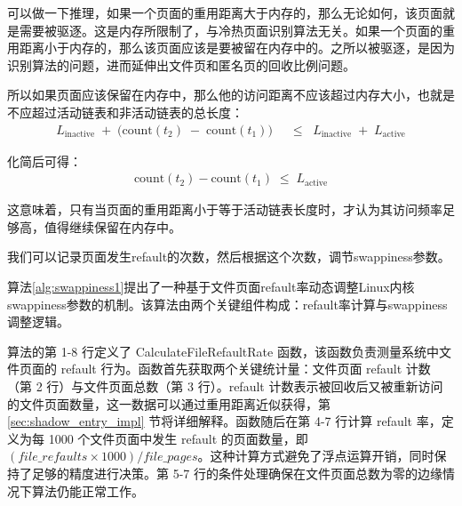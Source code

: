可以做一下推理，如果一个页面的重用距离大于内存的，那么无论如何，该页面就是需要被驱逐。这是内存所限制了，与冷热页面识别算法无关。如果一个页面的重用距离小于内存的，那么该页面应该是要被留在内存中的。之所以被驱逐，是因为识别算法的问题，进而延伸出文件页和匿名页的回收比例问题。

所以如果页面应该保留在内存中，那么他的访问距离不应该超过内存大小，也就是不应超过活动链表和非活动链表的总长度：
\begin{align}
  \label{eq:active_condition_1}
  L_{\mathrm{inactive}}
  \;+\;
  \bigl(\mathrm{count}(t_2) \;-\; \mathrm{count}(t_1)\bigr)
  &\;\;\le\;\;
  L_{\mathrm{inactive}}
  \;+\;
  L_{\mathrm{active}}
\end{align}

化简后可得：
\begin{align}
  \label{eq:active_condition}
  \mathrm{count}(t_2) - \mathrm{count}(t_1)
  \;\le\;
  L_{\mathrm{active}}
\end{align}

这意味着，只有当页面的重用距离小于等于活动链表长度时，才认为其访问频率足够高，值得继续保留在内存中。

我们可以记录页面发生refault的次数，然后根据这个次数，调节swappiness参数。

算法\ref{alg:swappiness1}提出了一种基于文件页面refault率动态调整Linux内核swappiness参数的机制。该算法由两个关键组件构成：refault率计算与swappiness调整逻辑。

算法的第 1-8 行定义了 CalculateFileRefaultRate 函数，该函数负责测量系统中文件页面的 refault 行为。函数首先获取两个关键统计量：文件页面 refault 计数（第 2 行）与文件页面总数（第 3 行）。refault 计数表示被回收后又被重新访问的文件页面数量，这一数据可以通过重用距离近似获得，第 \ref{sec:shadow_entry_impl} 节将详细解释。函数随后在第 4-7 行计算 refault 率，定义为每 1000 个文件页面中发生 refault 的页面数量，即 \((file\_refaults \times 1000) / file\_pages\)。这种计算方式避免了浮点运算开销，同时保持了足够的精度进行决策。第 5-7 行的条件处理确保在文件页面总数为零的边缘情况下算法仍能正常工作。

